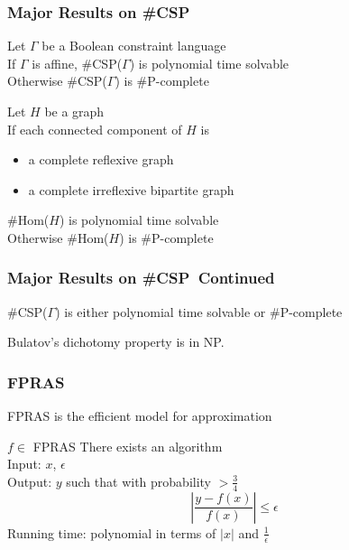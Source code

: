 \documentclass[a4paper,handout]{beamer}
\newcommand{\ccsp}{\#CSP}
\newcommand{\chom}{\#Hom}
\newcommand{\cpc}{\#P-complete}
\newcommand{\oneoeps}{\frac{1}{\epsilon}}
\newcommand{\eps}{\epsilon}
\theoremstyle{definition}
\begin{document}
\begin{frame}
\frametitle{Major Results on \ccsp}
\begin{theorem} 
Let \(\Gamma\) be a Boolean constraint language\\
If \(\Gamma\) is affine, \ccsp(\(\Gamma\)) is polynomial time solvable\\
Otherwise \ccsp(\(\Gamma\)) is \cpc
\end{theorem}

\pause

\begin{theorem}  
Let \(H\) be a graph\\
If each connected component of \(H\) is 
\begin{itemize}
\item a complete reflexive graph
\item a complete irreflexive bipartite graph
\end{itemize}
\chom(\(H\)) is polynomial time solvable\\
Otherwise \chom(\(H\)) is \cpc
\end{theorem}
\end{frame}

\begin{frame}
\frametitle{Major Results on \ccsp\ Continued}
\begin{theorem} [Bulatov 2008]
\ccsp(\(\Gamma\)) is either polynomial time solvable or \cpc
\end{theorem}
\pause

\begin{theorem}
Bulatov's dichotomy property is in NP.
\end{theorem}
\end{frame}

\begin{frame}
\frametitle{FPRAS}
FPRAS is the efficient model for approximation
\begin{block} {\(f \in \) FPRAS}
There exists an algorithm \\
Input: \(x\), \(\eps\) \\
Output: \(y\) such that with probability \( > \frac{3}{4}\)
\[\left|\frac{y-f(x)}{f(x)}\right| \le \eps\]
Running time: polynomial in terms of \(|x|\) and \(\oneoeps\)
\end{block}
\end{frame}
\end{document}
